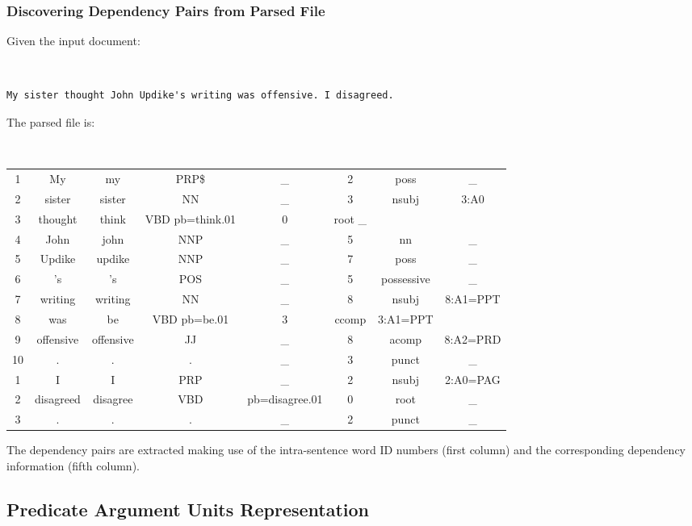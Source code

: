 \documentclass[11pt]{article}
\begin{document}
\subsubsection{Discovering Dependency Pairs from Parsed File} \label{sec:Discover}


Given the input document:

\begin{shaded} \tt
\begin{verbatim}
My sister thought John Updike's writing was offensive. I disagreed.
\end{verbatim}
\end{shaded}

The parsed file is:

\begin{shaded} \tt
\footnotesize
\begin{tabular}{cccccccc}
1 &	My &	my &	PRP\$ &	 \_	& 2	 & poss	 &\_ \\
2 &	sister &	sister &	NN &	\_ &	3 &	nsubj &	3:A0 \\
3 &	thought &	think &	VBD	pb=think.01 &	0 &	root	\_ \\
4 &	John &	john	 &NNP &	\_ &	5 &	nn &	 \_ \\
5 &	Updike &	updike &	 NNP &	\_ &	7 &	poss & \_ \\
6 &	's &	's &	POS	 &\_ &	5 &	possessive &	\_ \\
7 &	writing &	writing &	NN &	\_ &	8 &	nsubj &	8:A1=PPT \\
8 &	was &	be &	VBD	pb=be.01 &	3 &	 ccomp &	3:A1=PPT \\
9 &	offensive &	offensive &	JJ & \_	& 8 &	acomp &	8:A2=PRD \\
10 & 	. & 	. &	. &	\_ &	3 &	punct &	\_ \\

1 &	I &	I &	PRP	 & \_	 & 2	 & nsubj &	2:A0=PAG \\
2 &	disagreed &	disagree &	VBD	 & pb=disagree.01 & 	0 & 	root	 & \_ \\
3 &	. &	. &	. &	\_ &	2 &	punct &	\_ \\
\end{tabular}
\end{shaded}

The dependency pairs are extracted making use of the intra-sentence word ID numbers (first column) and the corresponding dependency information (fifth column).


\subsection{Predicate Argument Units Representation}
\end{document}
